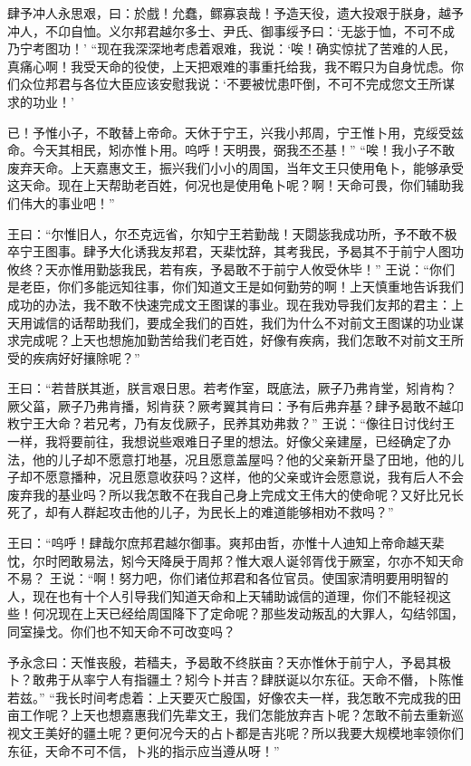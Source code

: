 \documentclass[12pt,UTF8]{ctexbook}
\begin{document}
肆予冲人永思艰，曰：於戲！允蠢，鳏寡哀哉！予造天役，遗大投艰于朕身，越予冲人，不卬自恤。义尔邦君越尔多士、尹氏、御事绥予曰：‘无毖于恤，不可不成乃宁考图功！’
“现在我深深地考虑着艰难，我说：‘唉！确实惊扰了苦难的人民，真痛心啊！我受天命的役使，上天把艰难的事重托给我，我不暇只为自身忧虑。你们众位邦君与各位大臣应该安慰我说：‘不要被忧患吓倒，不可不完成您文王所谋求的功业！’

已！予惟小子，不敢替上帝命。天休于宁王，兴我小邦周，宁王惟卜用，克绥受兹命。今天其相民，矧亦惟卜用。呜呼！天明畏，弼我丕丕基！”
“唉！我小子不敢废弃天命。上天嘉惠文王，振兴我们小小的周国，当年文王只使用龟卜，能够承受这天命。现在上天帮助老百姓，何况也是使用龟卜呢？啊！天命可畏，你们辅助我们伟大的事业吧！”

王曰：“尔惟旧人，尔丕克远省，尔知宁王若勤哉！天閟毖我成功所，予不敢不极卒宁王图事。肆予大化诱我友邦君，天棐忱辞，其考我民，予曷其不于前宁人图功攸终？天亦惟用勤毖我民，若有疾，予曷敢不于前宁人攸受休毕！”
王说：“你们是老臣，你们多能远知往事，你们知道文王是如何勤劳的啊！上天慎重地告诉我们成功的办法，我不敢不快速完成文王图谋的事业。现在我劝导我们友邦的君主：上天用诚信的话帮助我们，要成全我们的百姓，我们为什么不对前文王图谋的功业谋求完成呢？上天也想施加勤苦给我们老百姓，好像有疾病，我们怎敢不对前文王所受的疾病好好攘除呢？”

王曰：“若昔朕其逝，朕言艰日思。若考作室，既底法，厥子乃弗肯堂，矧肯构？厥父菑，厥子乃弗肯播，矧肯获？厥考翼其肯曰：予有后弗弃基？肆予曷敢不越卬敉宁王大命？若兄考，乃有友伐厥子，民养其劝弗救？”
王说：“像往日讨伐纣王一样，我将要前往，我想说些艰难日子里的想法。好像父亲建屋，已经确定了办法，他的儿子却不愿意打地基，况且愿意盖屋吗？他的父亲新开垦了田地，他的儿子却不愿意播种，况且愿意收获吗？这样，他的父亲或许会愿意说，我有后人不会废弃我的基业吗？所以我怎敢不在我自己身上完成文王伟大的使命呢？又好比兄长死了，却有人群起攻击他的儿子，为民长上的难道能够相劝不救吗？”

王曰：“呜呼！肆哉尔庶邦君越尔御事。爽邦由哲，亦惟十人迪知上帝命越天棐忱，尔时罔敢易法，矧今天降戾于周邦？惟大艰人诞邻胥伐于厥室，尔亦不知天命不易？
王说：“啊！努力吧，你们诸位邦君和各位官员。使国家清明要用明智的人，现在也有十个人引导我们知道天命和上天辅助诚信的道理，你们不能轻视这些！何况现在上天已经给周国降下了定命呢？那些发动叛乱的大罪人，勾结邻国，同室操戈。你们也不知天命不可改变吗？

予永念曰：天惟丧殷，若穑夫，予曷敢不终朕亩？天亦惟休于前宁人，予曷其极卜？敢弗于从率宁人有指疆土？矧今卜并吉？肆朕诞以尔东征。天命不僭，卜陈惟若兹。”
“我长时间考虑着：上天要灭亡殷国，好像农夫一样，我怎敢不完成我的田亩工作呢？上天也想嘉惠我们先辈文王，我们怎能放弃吉卜呢？怎敢不前去重新巡视文王美好的疆土呢？更何况今天的占卜都是吉兆呢？所以我要大规模地率领你们东征，天命不可不信，卜兆的指示应当遵从呀！”
\end{document}
